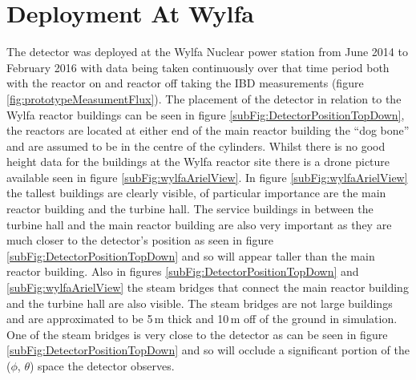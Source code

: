 \section{Deployment At Wylfa}\label{sec:deploymentAtWylfa}
The detector was deployed at the Wylfa Nuclear power station from June 2014 to February 2016 with data being taken continuously over that time period both with the reactor on and reactor off taking the IBD measurements \cite{Carroll_2018} (figure \ref{fig:prototypeMeasumentFlux}). The placement of the detector in relation to the Wylfa reactor buildings can be seen in figure \ref{subFig:DetectorPositionTopDown}, the reactors are located at either end of the main reactor building the ``dog bone'' and are assumed to be in the centre of the cylinders. Whilst there is no good height data for the buildings at the Wylfa reactor site there is a drone picture available seen in figure \ref{subFig:wylfaArielView}. In figure \ref{subFig:wylfaArielView} the tallest buildings are clearly visible, of particular importance are the main reactor building and the turbine hall. The service buildings in between the turbine hall and the  main reactor building are also very important as they are much closer to the detector's position as seen in figure \ref{subFig:DetectorPositionTopDown} and so will appear taller than the main reactor building. Also in figures \ref{subFig:DetectorPositionTopDown} and \ref{subFig:wylfaArielView} the steam bridges that connect the main reactor building and the turbine hall are also visible. The steam bridges are not large buildings and are approximated to be 5\,m thick and 10\,m off of the ground in simulation. One of the steam bridges is very close to the detector as can be seen in figure \ref{subFig:DetectorPositionTopDown} and so will occlude a significant portion of the ($\phi$, $\theta$) space the detector observes. 

